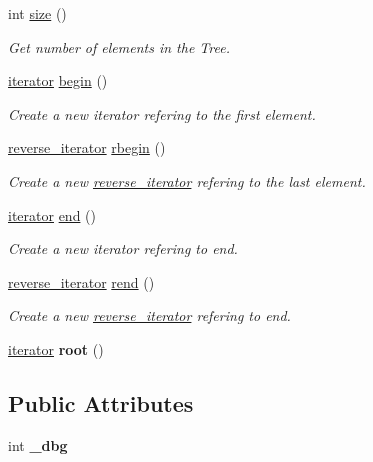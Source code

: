 \begin{DoxyCompactItemize}
\item 
int \hyperlink{classBTree_a3040e0a49ee348cae331deaf184bc5f2}{size} ()
\begin{DoxyCompactList}\small\item\em Get number of elements in the Tree. \item\end{DoxyCompactList}\item 
\hyperlink{classBTree_1_1iterator}{iterator} \hyperlink{classBTree_a5c6fa5221f301f0e565ccc936150d397}{begin} ()
\begin{DoxyCompactList}\small\item\em Create a new iterator refering to the first element. \item\end{DoxyCompactList}\item 
\hyperlink{classBTree_1_1reverse__iterator}{reverse\_\-iterator} \hyperlink{classBTree_a33f3a4f328058f83894661d56c381df2}{rbegin} ()
\begin{DoxyCompactList}\small\item\em Create a new \hyperlink{classBTree_1_1reverse__iterator}{reverse\_\-iterator} refering to the last element. \item\end{DoxyCompactList}\item 
\hyperlink{classBTree_1_1iterator}{iterator} \hyperlink{classBTree_a62b3be0c47a00d87522a0d513518674d}{end} ()
\begin{DoxyCompactList}\small\item\em Create a new iterator refering to end. \item\end{DoxyCompactList}\item 
\hyperlink{classBTree_1_1reverse__iterator}{reverse\_\-iterator} \hyperlink{classBTree_adc0e82885f8ea8a14b5e9526ce85855c}{rend} ()
\begin{DoxyCompactList}\small\item\em Create a new \hyperlink{classBTree_1_1reverse__iterator}{reverse\_\-iterator} refering to end. \item\end{DoxyCompactList}\item 
\hypertarget{classBTree_a3d096d7af01fff2e3855acda2a44bd09}{
\hyperlink{classBTree_1_1iterator}{iterator} {\bfseries root} ()}
\label{classBTree_a3d096d7af01fff2e3855acda2a44bd09}

\end{DoxyCompactItemize}
\subsection*{Public Attributes}
\begin{DoxyCompactItemize}
\item 
\hypertarget{classBTree_a499f5a2d32a678f7b1401176f14bbcdb}{
int {\bfseries \_\-dbg}}
\label{classBTree_a499f5a2d32a678f7b1401176f14bbcdb}

\end{DoxyCompactItemize}
